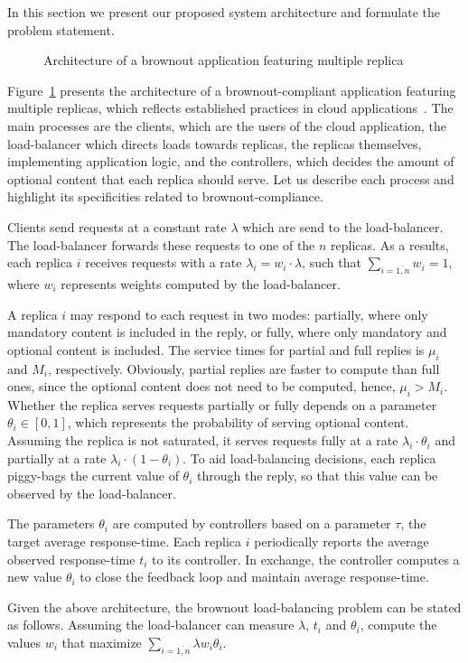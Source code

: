 In this section we present our proposed system architecture and formulate the problem statement.

\begin{figure}
	\centering
	
	\caption{Architecture of a brownout application featuring multiple replica}
	\label{fig:architecture}
\end{figure}

Figure~\ref{fig:architecture} presents the architecture of a brownout-compliant application featuring multiple replicas, which reflects established practices in cloud applications~\cite{Barroso09}. The main processes are the clients, which are the users of the cloud application, the load-balancer which directs loads towards replicas, the replicas themselves, implementing application logic, and the controllers, which decides the amount of optional content that each replica should serve. Let us describe each process and highlight its specificities related to brownout-compliance.

Clients send requests at a constant rate $\lambda$ which are send to the load-balancer. The load-balancer forwards these requests to one of the $n$ replicas. As a results, each replica $i$ receives requests with a rate $\lambda_i = w_i \cdot \lambda$, such that $\sum_{i=\overline{1,n}} w_i = 1$, where $w_i$ represents weights computed by the load-balancer.

A replica $i$ may respond to each request in two modes: partially, where only mandatory content is included in the reply, or fully, where only mandatory and optional content is included. The service times for partial and full replies is $\mu_i$ and $M_i$, respectively. Obviously, partial replies are faster to compute than full ones, since the optional content does not need to be computed, hence, $\mu_i>M_i$. Whether the replica serves requests partially or fully depends on a parameter $\theta_i \in [0, 1]$, which represents the probability of serving optional content. Assuming the replica is not saturated, it serves requests fully at a rate $\lambda_i \cdot \theta_i$ and partially at a rate $\lambda_i \cdot (1-\theta_i)$. To aid load-balancing decisions, each replica piggy-bags the current value of $\theta_i$ through the reply, so that this value can be observed by the load-balancer.

The parameters $\theta_i$ are computed by controllers based on a parameter $\tau$, the target average response-time. Each replica $i$ periodically reports the average observed response-time $t_i$ to its controller. In exchange, the controller computes a new value $\theta_i$ to close the feedback loop and maintain average response-time.

Given the above architecture, the brownout load-balancing problem can be stated as follows. Assuming the load-balancer can measure $\lambda$, $t_i$ and $\theta_i$, compute the values $w_i$ that maximize $\sum_{i=\overline{1,n}} \lambda w_i \theta_i$.

